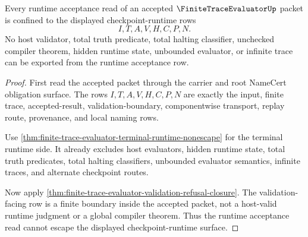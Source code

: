 \begin{theorem}
\label{thm:finitetrace-evaluator-runtime-acceptance-nonescape}
Every runtime acceptance read of an accepted $\FiniteTraceEvaluatorUp$ packet
is confined to the displayed checkpoint-runtime rows
$$
I,T,A,V,H,C,P,N.
$$
No host validator, total truth predicate, total halting classifier, unchecked
compiler theorem, hidden runtime state, unbounded evaluator, or infinite trace
can be exported from the runtime acceptance row.
\end{theorem}
\begin{proof}
First read the accepted packet through the carrier and root NameCert
obligation surface. The rows $I,T,A,V,H,C,P,N$ are exactly the input, finite
trace, accepted-result, validation-boundary, componentwise transport, replay
route, provenance, and local naming rows.

Use \autoref{thm:finite-trace-evaluator-terminal-runtime-nonescape} for the
terminal runtime side. It already excludes host evaluators, hidden runtime
state, total truth predicates, total halting classifiers, unbounded evaluator
semantics, infinite traces, and alternate checkpoint routes.

Now apply \autoref{thm:finite-trace-evaluator-validation-refusal-closure}. The
validation-facing row is a finite boundary inside the accepted packet, not a
host-valid runtime judgment or a global compiler theorem. Thus the runtime
acceptance read cannot escape the displayed checkpoint-runtime surface.
\end{proof}

